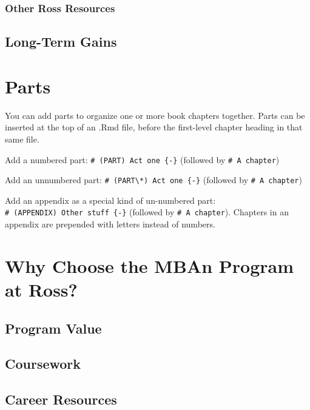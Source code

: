 \documentclass[
]{book}
\begin{document}
\hypertarget{other-ross-resources}{%
\subsection{Other Ross Resources}\label{other-ross-resources}}

\hypertarget{long-term-gains}{%
\section{Long-Term Gains}\label{long-term-gains}}

\hypertarget{parts}{%
\chapter{Parts}\label{parts}}

You can add parts to organize one or more book chapters together. Parts can be inserted at the top of an .Rmd file, before the first-level chapter heading in that same file.

Add a numbered part: \texttt{\#\ (PART)\ Act\ one\ \{-\}} (followed by \texttt{\#\ A\ chapter})

Add an unnumbered part: \texttt{\#\ (PART\textbackslash{}*)\ Act\ one\ \{-\}} (followed by \texttt{\#\ A\ chapter})

Add an appendix as a special kind of un-numbered part: \texttt{\#\ (APPENDIX)\ Other\ stuff\ \{-\}} (followed by \texttt{\#\ A\ chapter}). Chapters in an appendix are prepended with letters instead of numbers.

\hypertarget{why-choose-the-mban-program-at-ross-1}{%
\chapter{Why Choose the MBAn Program at Ross?}\label{why-choose-the-mban-program-at-ross-1}}

\hypertarget{program-value-1}{%
\section{Program Value}\label{program-value-1}}

\hypertarget{coursework-1}{%
\section{Coursework}\label{coursework-1}}

\hypertarget{career-resources-1}{%
\section{Career Resources}\label{career-resources-1}}
\end{document}
